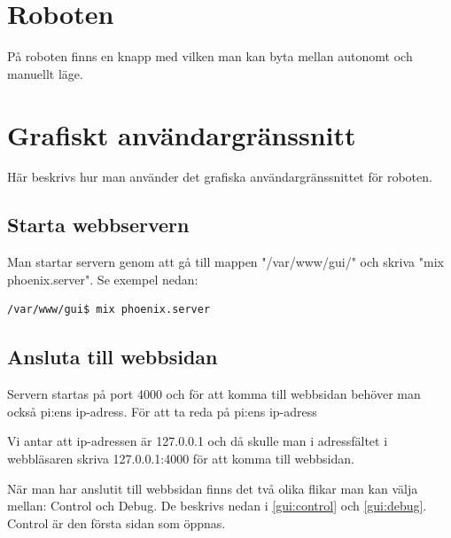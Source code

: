 \documentclass[a4paper,titlepage,12pt]{article}
\begin{document}
	
    \newpage
	\section{Roboten}
    På roboten finns en knapp med vilken man kan byta mellan autonomt och
    manuellt läge.

	

    \newpage
	\section{Grafiskt användargränssnitt}
	Här beskrivs hur man använder det grafiska användargränssnittet för roboten.
	
	\subsection{Starta webbservern}
	Man startar servern genom att gå till mappen "/var/www/gui/" och skriva "mix
    phoenix.server". Se exempel nedan:
	
	\begin{lstlisting}[style=linux]
	/var/www/gui$ mix phoenix.server
	\end{lstlisting}
	
	\subsection{Ansluta till webbsidan}
	Servern startas på port 4000 och för att komma till webbsidan behöver man
    också pi:ens ip-adress. För att ta reda på pi:ens ip-adress
	
	Vi antar att ip-adressen är 127.0.0.1 och då skulle man i adressfältet i
    webbläsaren skriva 127.0.0.1:4000 för att komma till webbsidan.
	
	När man har anslutit till webbsidan finns det två olika flikar man kan välja
    mellan: Control och Debug. De beskrivs nedan i \ref{gui:control} och
    \ref{gui:debug}. Control är den första sidan som öppnas.
    \newpage
	
\end{document}
